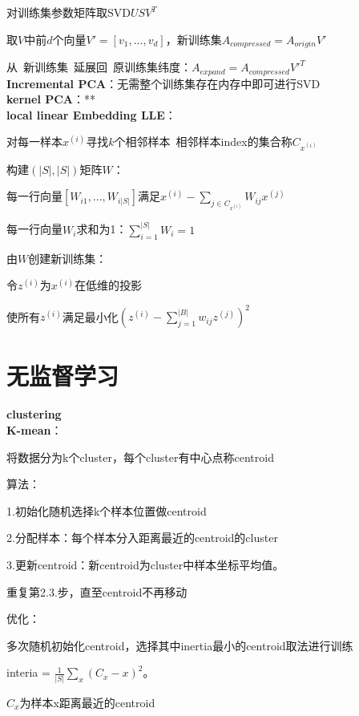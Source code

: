 \documentclass[UTF8]{ctexart}
\begin{document}
  对训练集参数矩阵取SVD$USV^T$

  取$V$中前$d$个向量$V' = [v_1, ..., v_d]$，新训练集$A_{compressed} = A_{origin}V'$
  
  从\ 新训练集\ 延展回\ 原训练集纬度：$A_{expand} = A_{compressed}V'^T$\\
\textbf{Incremental PCA}：无需整个训练集存在内存中即可进行SVD\\
\textbf{kernel PCA}：**\\
\textbf{local linear Embedding LLE}：
  
  对每一样本$x^{(i)}$寻找$k$个相邻样本\ 相邻样本index的集合称$C_{x^{(i)}}$
  
  构建$(|S|, |S|)$矩阵$W$：
  
  \quad 每一行向量$[W_{i1}, ..., W_{i|S|}]$满足$x^{(i)} - \sum_{j \in C_{x^{(i)}}} W_{ij}x^{(j)}$
  
  \quad 每一行向量$W_i$求和为1：$\sum_{i=1}^{|S|}W_i = 1$

  由$W$创建新训练集：

  \quad 令$z^{(i)}$为$x^{(i)}$在低维的投影

  \quad 使所有$z^{(i)}$满足最小化$(z^{(i)} - \sum_{j=1}^{|B|}w_{ij}z^{(j)})^2$

\section{无监督学习}
\noindent \textbf{clustering}\\
\textbf{K-mean}：

  将数据分为k个cluster，每个cluster有中心点称centroid
  
  算法：
  
  \quad 1.初始化随机选择k个样本位置做centroid

  \quad 2.分配样本：每个样本分入距离最近的centroid的cluster

  \quad 3.更新centroid：新centroid为cluster中样本坐标平均值。
  
  \quad 重复第2.3.步，直至centroid不再移动

  优化：
  
  \quad 多次随机初始化centroid，选择其中inertia最小的centroid取法进行训练

  \quad \quad interia = $\frac{1}{|S|}\sum_x (C_x - x)^2$。

  \quad \quad \quad $C_x$为样本x距离最近的centroid
\end{document}
